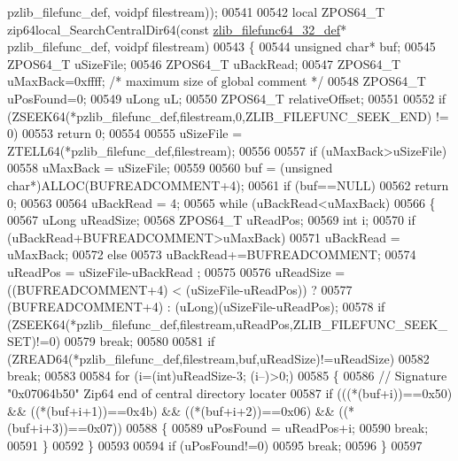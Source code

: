 \begin{DoxyCode}
      pzlib\_filefunc\_def, voidpf filestream));
00541 
00542 local ZPOS64\_T zip64local\_SearchCentralDir64(\textcolor{keyword}{const} \hyperlink{structzlib__filefunc64__32__def__s}{zlib\_filefunc64\_32\_def}* 
      pzlib\_filefunc\_def, voidpf filestream)
00543 \{
00544   \textcolor{keywordtype}{unsigned} \textcolor{keywordtype}{char}* buf;
00545   ZPOS64\_T uSizeFile;
00546   ZPOS64\_T uBackRead;
00547   ZPOS64\_T uMaxBack=0xffff; \textcolor{comment}{/* maximum size of global comment */}
00548   ZPOS64\_T uPosFound=0;
00549   uLong uL;
00550   ZPOS64\_T relativeOffset;
00551 
00552   \textcolor{keywordflow}{if} (ZSEEK64(*pzlib\_filefunc\_def,filestream,0,ZLIB\_FILEFUNC\_SEEK\_END) != 0)
00553     \textcolor{keywordflow}{return} 0;
00554 
00555   uSizeFile = ZTELL64(*pzlib\_filefunc\_def,filestream);
00556 
00557   \textcolor{keywordflow}{if} (uMaxBack>uSizeFile)
00558     uMaxBack = uSizeFile;
00559 
00560   buf = (\textcolor{keywordtype}{unsigned} \textcolor{keywordtype}{char}*)ALLOC(BUFREADCOMMENT+4);
00561   \textcolor{keywordflow}{if} (buf==NULL)
00562     \textcolor{keywordflow}{return} 0;
00563 
00564   uBackRead = 4;
00565   \textcolor{keywordflow}{while} (uBackRead<uMaxBack)
00566   \{
00567     uLong uReadSize;
00568     ZPOS64\_T uReadPos;
00569     \textcolor{keywordtype}{int} i;
00570     \textcolor{keywordflow}{if} (uBackRead+BUFREADCOMMENT>uMaxBack)
00571       uBackRead = uMaxBack;
00572     \textcolor{keywordflow}{else}
00573       uBackRead+=BUFREADCOMMENT;
00574     uReadPos = uSizeFile-uBackRead ;
00575 
00576     uReadSize = ((BUFREADCOMMENT+4) < (uSizeFile-uReadPos)) ?
00577       (BUFREADCOMMENT+4) : (uLong)(uSizeFile-uReadPos);
00578     \textcolor{keywordflow}{if} (ZSEEK64(*pzlib\_filefunc\_def,filestream,uReadPos,ZLIB\_FILEFUNC\_SEEK\_SET)!=0)
00579       \textcolor{keywordflow}{break};
00580 
00581     \textcolor{keywordflow}{if} (ZREAD64(*pzlib\_filefunc\_def,filestream,buf,uReadSize)!=uReadSize)
00582       \textcolor{keywordflow}{break};
00583 
00584     \textcolor{keywordflow}{for} (i=(\textcolor{keywordtype}{int})uReadSize-3; (i--)>0;)
00585     \{
00586       \textcolor{comment}{// Signature "0x07064b50" Zip64 end of central directory locater}
00587       \textcolor{keywordflow}{if} (((*(buf+i))==0x50) && ((*(buf+i+1))==0x4b) && ((*(buf+i+2))==0x06) && ((*(buf+i+3))==0x07))
00588       \{
00589         uPosFound = uReadPos+i;
00590         \textcolor{keywordflow}{break};
00591       \}
00592     \}
00593 
00594       \textcolor{keywordflow}{if} (uPosFound!=0)
00595         \textcolor{keywordflow}{break};
00596   \}
00597 

\end{DoxyCode}
